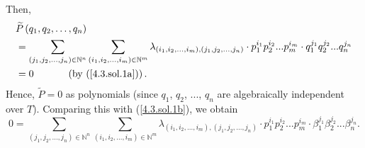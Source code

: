 \documentclass[numbers=enddot,12pt,final,onecolumn,notitlepage]{scrartcl}%
\begin{document}
Then,%
\begin{align*}
&  \widetilde{P}\left(  q_{1},q_{2},\ldots,q_{n}\right) \\
&  =\sum\limits_{\left(  j_{1},j_{2},...,j_{n}\right)  \in\mathbb{N}^{n}}%
\sum\limits_{\left(  i_{1},i_{2},...,i_{m}\right)  \in\mathbb{N}^{m}}%
\lambda_{\left(  i_{1},i_{2},...,i_{m}\right)  ,\left(  j_{1},j_{2}%
,...,j_{n}\right)  }\cdot p_{1}^{i_{1}}p_{2}^{i_{2}}...p_{m}^{i_{m}}\cdot
q_{1}^{j_{1}}q_{2}^{j_{2}}...q_{n}^{j_{n}}\\
&  =0\ \ \ \ \ \ \ \ \ \ \left(  \text{by (\ref{4.3.sol.1a})}\right)  .
\end{align*}
Hence, $\widetilde{P}=0$ as polynomials (since $q_{1}$, $q_{2}$, $...$,
$q_{n}$ are algebraically independent over $T$). Comparing this with
(\ref{4.3.sol.1b}), we obtain%
\begin{equation}
0=\sum\limits_{\left(  j_{1},j_{2},...,j_{n}\right)  \in\mathbb{N}^{n}}%
\sum\limits_{\left(  i_{1},i_{2},...,i_{m}\right)  \in\mathbb{N}^{m}}%
\lambda_{\left(  i_{1},i_{2},...,i_{m}\right)  ,\left(  j_{1},j_{2}%
,...,j_{n}\right)  }\cdot p_{1}^{i_{1}}p_{2}^{i_{2}}...p_{m}^{i_{m}}\cdot
\beta_{1}^{j_{1}}\beta_{2}^{j_{2}}...\beta_{n}^{j_{n}}. \label{4.3.sol.2}%
\end{equation}
\end{document}
